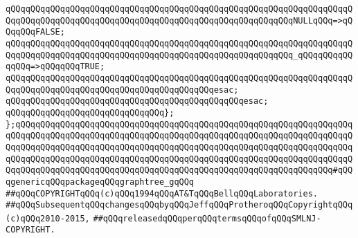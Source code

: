 \verb|qQQqqQQqqQQqqQQqqQQqqQQqqQQqqQQqqQQqqQQqqQQqqQQqqQQqqQQqqQQqqQQqqQQqqQQqqQQqqQQqqQQqqQQqqQQqqQQqqQQqqQQqqQQqqQQqqQQqqQQqqQQqqQQqNULLqQQq=>qQQqqQQqFALSE;|\newline
\verb|qQQqqQQqqQQqqQQqqQQqqQQqqQQqqQQqqQQqqQQqqQQqqQQqqQQqqQQqqQQqqQQqqQQqqQQqqQQqqQQqqQQqqQQqqQQqqQQqqQQqqQQqqQQqqQQqqQQqqQQqqQQqqQQq_qQQqqQQqqQQqqQQq=>qQQqqQQqTRUE;|\newline
\verb|qQQqqQQqqQQqqQQqqQQqqQQqqQQqqQQqqQQqqQQqqQQqqQQqqQQqqQQqqQQqqQQqqQQqqQQqqQQqqQQqqQQqqQQqqQQqqQQqqQQqqQQqqQQqqQQqesac;|\newline
\verb|qQQqqQQqqQQqqQQqqQQqqQQqqQQqqQQqqQQqqQQqqQQqqQQqesac;|\newline
\verb|qQQqqQQqqQQqqQQqqQQqqQQqqQQqqQQq};|\newline
\verb|};qQQqqQQqqQQqqQQqqQQqqQQqqQQqqQQqqQQqqQQqqQQqqQQqqQQqqQQqqQQqqQQqqQQqqQQqqQQqqQQqqQQqqQQqqQQqqQQqqQQqqQQqqQQqqQQqqQQqqQQqqQQqqQQqqQQqqQQqqQQqqQQqqQQqqQQqqQQqqQQqqQQqqQQqqQQqqQQqqQQqqQQqqQQqqQQqqQQqqQQqqQQqqQQqqQQqqQQqqQQqqQQqqQQqqQQqqQQqqQQqqQQqqQQqqQQqqQQqqQQqqQQqqQQqqQQqqQQqqQQqqQQqqQQqqQQqqQQqqQQqqQQqqQQqqQQqqQQqqQQqqQQqqQQqqQQqqQQqqQQqqQQq#qQQqgenericqQQqpackageqQQqgraphtree_gqQQq|\newline
\newline
\newline
\newline
\newline
\verb|##qQQqCOPYRIGHTqQQq(c)qQQq1994qQQqAT&TqQQqBellqQQqLaboratories.|\newline
\verb|##qQQqSubsequentqQQqchangesqQQqbyqQQqJeffqQQqProtheroqQQqCopyrightqQQq(c)qQQq2010-2015,|\newline
\verb|##qQQqreleasedqQQqperqQQqtermsqQQqofqQQqSMLNJ-COPYRIGHT.|\newline

